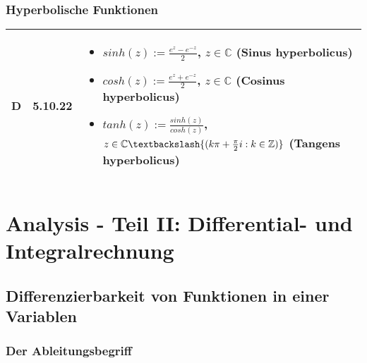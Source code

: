 \subsubsection{Hyperbolische Funktionen}
      
    \begin{longtable}{p{0.75cm} p{1cm} p{16cm}}
        \toprule

        D   & 5.10.22&  \begin{itemize}[topsep=-0.5cm]
                            \item[] $sinh(z) := \frac{e^z-e^{-z}}{2}$, $z \in \mathbb{C}$ (\textbf{Sinus hyperbolicus})
                            \item[] $cosh(z) := \frac{e^z+e^{-z}}{2}$, $z \in \mathbb{C}$ (\textbf{Cosinus hyperbolicus})
                            \item[] $tanh(z) := \frac{sinh(z)}{cosh(z)}$, $z \in \mathbb{C} \textbackslash \{(k\pi + \frac{\pi}{2}i: k \in \mathbb{Z})\}$ (\textbf{Tangens hyperbolicus})
                        \end{itemize} \vspace{-0cm} \\

        \bottomrule

    \end{longtable}

\section{Analysis - Teil II: Differential- und Integralrechnung}
\subsection{Differenzierbarkeit von Funktionen in einer Variablen}
\subsubsection{Der Ableitungsbegriff}

